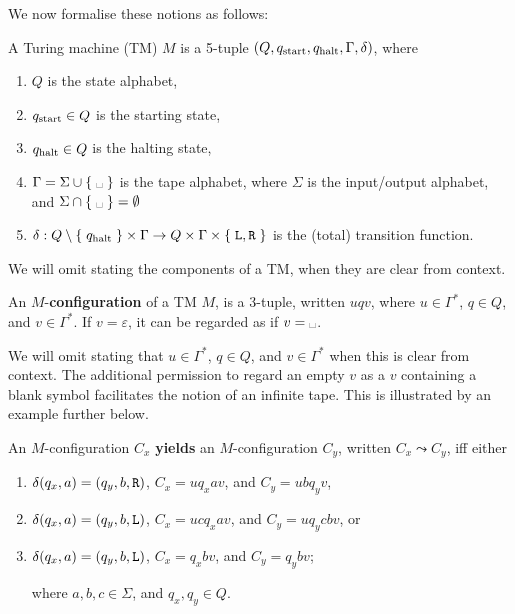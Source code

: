 We now formalise these notions as follows:

\begin{definition} A Turing machine (TM) $M$ is a 5-tuple $\mathopen{}\left({Q, q_{\text{start}},
q_{\text{halt}}, \Gamma, \delta}\right)\mathclose{}$, where

\begin{enumerate}

\item $Q$ is the state alphabet,

\item $q_{\text{start}} \in Q$ is the starting state,

\item $q_{\text{halt}} \in Q$ is the halting state,

\item $\Gamma = \Sigma \cup \set{\blank}$ is the tape alphabet, where $\Sigma$
is the input/output alphabet, and $\Sigma \cap \set{\blank} = \emptyset$

\item $\delta : Q \setminus \mathopen{}\left\{\mathrel{}{q_{\text{halt}}}\mathrel{}\right\}\mathclose{} \times \Gamma \rightarrow Q \times
\Gamma \times \mathopen{}\left\{\mathrel{}{\mathtt{L}, \mathtt{R}}\mathrel{}\right\}\mathclose{}$ is the (total) transition function.

\end{enumerate}

We will omit stating the components of a TM, when they are clear from context.

\end{definition}

\begin{definition} An $M$-\textbf{configuration} of a TM $M$, is a 3-tuple,
written $uqv$, where $u\in\Gamma^*$, $q\in Q$, and $v\in\Gamma^*$. If
$v=\varepsilon$, it can be regarded as if $v=\blank$. \end{definition}

We will omit stating that $u\in\Gamma^*$, $q\in Q$, and $v\in\Gamma^*$ when
this is clear from context. The additional permission to regard an empty $v$ as
a $v$ containing a blank symbol facilitates the notion of an infinite tape.
This is illustrated by an example further below.

\begin{definition} An $M$-configuration $C_x$ \textbf{yields} an
$M$-configuration $C_y$, written $C_x\leadsto C_y$, iff either

\begin{enumerate}

\item $\delta\mathopen{}\left({q_x,a}\right)\mathclose{}=\mathopen{}\left({q_y,b,\mathtt{R}}\right)\mathclose{}$, $C_x=uq_xav$, and $C_y=ubq_yv$,

\item $\delta\mathopen{}\left({q_x,a}\right)\mathclose{}=\mathopen{}\left({q_y,b,\mathtt{L}}\right)\mathclose{}$, $C_x=ucq_xav$, and $C_y=uq_ycbv$,
or

\item $\delta\mathopen{}\left({q_x,a}\right)\mathclose{}=\mathopen{}\left({q_y,b,\mathtt{L}}\right)\mathclose{}$, $C_x=q_xbv$,  and $C_y=q_ybv$;

where $a,b,c\in\Sigma$, and $q_x,q_y\in Q$.

\end{enumerate}

\end{definition}

